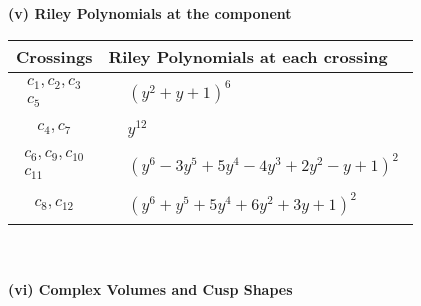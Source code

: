 \documentclass[1p]{elsarticle_modified}
\theoremstyle{definition}
\begin{document}
\newpage\renewcommand{\arraystretch}{1}
\flushleft \textbf{(v) Riley Polynomials at the component}\newline \\
\begin{tabular}{m{50pt}|m{274pt}}
Crossings & \hspace{64pt}Riley Polynomials at each crossing \\
\hline $$\begin{aligned}c_{1},c_{2},c_{3}\\c_{5}\end{aligned}$$&$\begin{aligned}
&(y^2+y+1)^6
\end{aligned}$\\
\hline $$\begin{aligned}c_{4},c_{7}\end{aligned}$$&$\begin{aligned}
&y^{12}
\end{aligned}$\\
\hline $$\begin{aligned}c_{6},c_{9},c_{10}\\c_{11}\end{aligned}$$&$\begin{aligned}
&(y^6-3 y^5+5 y^4-4 y^3+2 y^2- y+1)^2
\end{aligned}$\\
\hline $$\begin{aligned}c_{8},c_{12}\end{aligned}$$&$\begin{aligned}
&(y^6+y^5+5 y^4+6 y^2+3 y+1)^2
\end{aligned}$\\
\hline
\end{tabular}\\~\\
\newpage\flushleft \textbf{(vi) Complex Volumes and Cusp Shapes}
\end{document}
